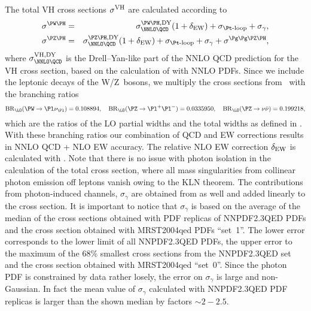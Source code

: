 The total VH cross sections $\sigma^{\mathrm{VH}}$ are calculated according to
\begin{eqnarray}
\sigma^{\PW\PH} &=& \sigma_{\NNLO \QCD}^{\PW\PH,\DY} (1+\delta_{\ELWK}) + \sigma_{\Pt\mbox{\scriptsize -loop}} + \sigma_{\gamma},
\label{eq:sigmaWH}
\\
\sigma^{\PZ\PH} &=& \sigma_{\NNLO \QCD}^{\PZ\PH,\DY} (1+\delta_{\ELWK}) 
+ \sigma_{\Pt\mbox{\scriptsize -loop}} + \sigma_{\gamma} + \sigma^{\Pg\Pg\PZ\PH},
\label{eq:sigmaZH}
\end{eqnarray}
where $\sigma_{\NNLO \QCD}^{\VH,\DY}$ is the Drell--Yan-like part of the
NNLO QCD prediction for the VH cross section, based on the calculation
of  with NNLO PDFs.
Since we include the leptonic decays of the W/Z~bosons, we multiply the
cross sections from \VHNNLO\ with the branching ratios
\begin{equation}
\mathrm{BR}_{\LO}(\PW\to\Pl\nu_{\Pl}) = 0.108894, \quad
\mathrm{BR}_{\LO}(\PZ\to\Pl^+\Pl^-) = 0.0335950, \quad
\mathrm{BR}_{\LO}(\PZ\to\nu\bar\nu) = 0.199218,
\end{equation}
which are the ratios of the LO partial widths and the total widths as defined in .
With these branching ratios our combination of QCD and EW corrections results in
NNLO QCD + NLO EW accuracy.
The relative NLO EW correction $\delta_{\mathrm{EW}}$ is calculated with \HAWK{}.
Note that there is no issue with photon isolation in the calculation of the total cross section,
where all mass singularities from collinear photon emission off leptons vanish owing to the
KLN theorem.
The contributions from photon-induced channels, $\sigma_{\gamma}$
are obtained from \HAWK{} as well and added linearly to the cross section.
It is important to notice that $\sigma_{\gamma}$ is based on the average of the
median of the cross sections obtained with PDF replicas of NNPDF2.3QED PDFs 
and the cross section obtained with MRST2004qed PDFs ``set~1''.
The lower error corresponds to the lower limit of all NNPDF2.3QED PDFs, 
the upper error to the maximum of the 68\% smallest cross sections from
the NNPDF2.3QED set and the cross section obtained with MRST2004qed ``set~0''.
Since the photon PDF is constrained by data rather losely, the error on
$\sigma_{\gamma}$ is large and non-Gaussian. In fact the mean value of
$\sigma_{\gamma}$ calculated with NNPDF2.3QED PDF replicas is
larger than the shown median by factors $\sim2{-}2.5$.

